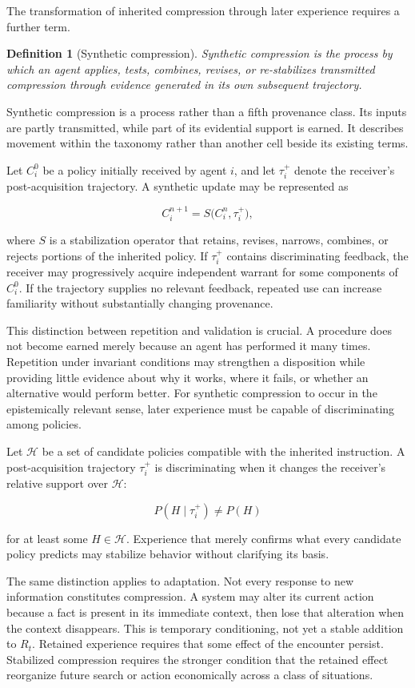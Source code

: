 \documentclass[11pt]{article}
\newtheorem{definition}[proposition]{Definition}
\begin{document}
The transformation of inherited compression through later experience requires a further term.

\begin{definition}[Synthetic compression]
Synthetic compression is the process by which an agent applies, tests, combines, revises, or re-stabilizes transmitted compression through evidence generated in its own subsequent trajectory.
\end{definition}

Synthetic compression is a process rather than a fifth provenance class. Its inputs are partly transmitted, while part of its evidential support is earned. It describes movement within the taxonomy rather than another cell beside its existing terms.

Let $C_i^0$ be a policy initially received by agent $i$, and let $\tau_i^{+}$ denote the receiver's post-acquisition trajectory. A synthetic update may be represented as

\[
C_i^{n+1}
=
S\bigl(C_i^n,\tau_i^{+}\bigr),
\]

where $S$ is a stabilization operator that retains, revises, narrows, combines, or rejects portions of the inherited policy. If $\tau_i^{+}$ contains discriminating feedback, the receiver may progressively acquire independent warrant for some components of $C_i^0$. If the trajectory supplies no relevant feedback, repeated use can increase familiarity without substantially changing provenance.

This distinction between repetition and validation is crucial. A procedure does not become earned merely because an agent has performed it many times. Repetition under invariant conditions may strengthen a disposition while providing little evidence about why it works, where it fails, or whether an alternative would perform better. For synthetic compression to occur in the epistemically relevant sense, later experience must be capable of discriminating among policies.

Let $\mathcal{H}$ be a set of candidate policies compatible with the inherited instruction. A post-acquisition trajectory $\tau_i^{+}$ is discriminating when it changes the receiver's relative support over $\mathcal{H}$:

\[
P(H \mid \tau_i^{+}) \neq P(H)
\]

for at least some $H \in \mathcal{H}$. Experience that merely confirms what every candidate policy predicts may stabilize behavior without clarifying its basis.

The same distinction applies to adaptation. Not every response to new information constitutes compression. A system may alter its current action because a fact is present in its immediate context, then lose that alteration when the context disappears. This is temporary conditioning, not yet a stable addition to $R_t$. Retained experience requires that some effect of the encounter persist. Stabilized compression requires the stronger condition that the retained effect reorganize future search or action economically across a class of situations.
\end{document}
